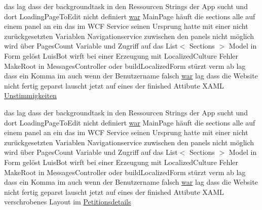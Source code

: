 \begin{DoxyCompactItemize}
\item 
das lag dass der backgroundtask in den Ressourcen Strings der App sucht und dort Loading\+Page\+To\+Edit nicht definiert \hyperlink{_r_e_a_d_m_e_8txt_a2a72fc7da943588cba8c302409b22e53}{war} Main\+Page häuft die sections alle auf einem panel an ein das im W\+CF Service seinen Ursprung hatte mit einer nicht zurückgesetzten Variablen Navigationservice zuwischen den panels nicht möglich wird über Pages\+Count Variable und Zugriff auf das List$<$ Sections $>$ Model in Form gelöst Luis\+Bot wirft bei einer Erzeugung mit Localized\+Culture Fehler Make\+Root in Messages\+Controller oder build\+Localized\+Form stürzt verm ab lag dass ein Komma im auch wenn der Benutzername falsch \hyperlink{_r_e_a_d_m_e_8txt_a2a72fc7da943588cba8c302409b22e53}{war} lag dass die Website nicht fertig geparst lauscht jetzt auf eines der finished Attibute X\+A\+ML \hyperlink{_r_e_a_d_m_e_8txt_ac0dcc138103869e0359e06225049e770}{Unstimmigkeiten}
\item 
das lag dass der backgroundtask in den Ressourcen Strings der App sucht und dort Loading\+Page\+To\+Edit nicht definiert \hyperlink{_r_e_a_d_m_e_8txt_a2a72fc7da943588cba8c302409b22e53}{war} Main\+Page häuft die sections alle auf einem panel an ein das im W\+CF Service seinen Ursprung hatte mit einer nicht zurückgesetzten Variablen Navigationservice zuwischen den panels nicht möglich wird über Pages\+Count Variable und Zugriff auf das List$<$ Sections $>$ Model in Form gelöst Luis\+Bot wirft bei einer Erzeugung mit Localized\+Culture Fehler Make\+Root in Messages\+Controller oder build\+Localized\+Form stürzt verm ab lag dass ein Komma im auch wenn der Benutzername falsch \hyperlink{_r_e_a_d_m_e_8txt_a2a72fc7da943588cba8c302409b22e53}{war} lag dass die Website nicht fertig geparst lauscht jetzt auf eines der finished Attibute X\+A\+ML verschrobenes Layout im \hyperlink{_r_e_a_d_m_e_8txt_ab1eb46320c0ab46284b341bc594406ed}{Petitionsdetails}
\item 

\end{DoxyCompactItemize}
